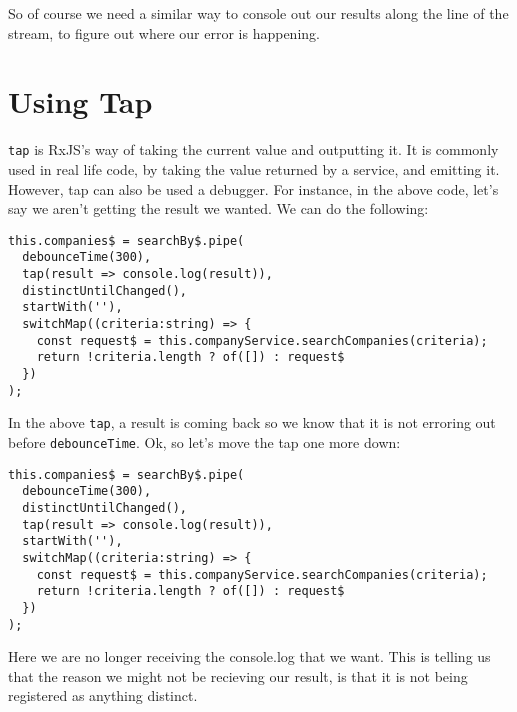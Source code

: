 So of course we need a similar way to console out our results along the line of the stream, to figure out where our error is happening.

\section{Using Tap}
\lstinline{tap} is RxJS's way of taking the current value and outputting it. It is commonly used in real life code, by taking the value returned by a service, and emitting it. However, tap can also be used a debugger. For instance, in the above code, let's say we aren't getting the result we wanted. We can do the following: 
\begin{lstlisting}
this.companies$ = searchBy$.pipe(
  debounceTime(300),
  tap(result => console.log(result)),
  distinctUntilChanged(),
  startWith(''),
  switchMap((criteria:string) => {
    const request$ = this.companyService.searchCompanies(criteria);
    return !criteria.length ? of([]) : request$
  })
);  
\end{lstlisting}

In the above \lstinline{tap}, a result is coming back so we know that it is not erroring out before \lstinline{debounceTime}. Ok, so let's move the tap one more down: 
\begin{lstlisting}
this.companies$ = searchBy$.pipe(
  debounceTime(300),
  distinctUntilChanged(),
  tap(result => console.log(result)),
  startWith(''),
  switchMap((criteria:string) => {
    const request$ = this.companyService.searchCompanies(criteria);
    return !criteria.length ? of([]) : request$
  })
);  
\end{lstlisting}

Here we are no longer receiving the console.log that we want. This is telling us that the reason we might not be recieving our result, is that it is not being registered as anything distinct.

